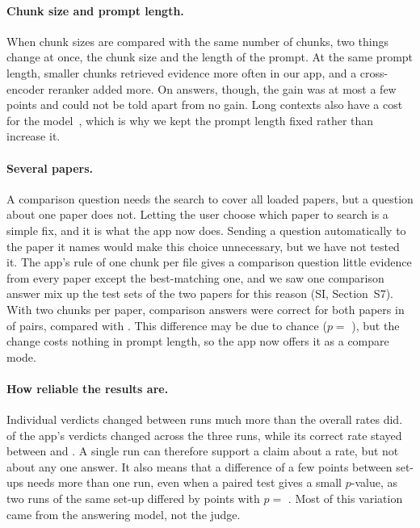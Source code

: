 \paragraph{Chunk size and prompt length.} When chunk sizes are compared with the same number of
chunks, two things change at once, the chunk size and the length of the prompt. At the same
prompt length, smaller chunks retrieved evidence more often in our app, and a cross-encoder
reranker added more. On answers, though, the gain was at most a few points and could not be told
apart from no gain. Long contexts also have a cost for the model~\cite{liu2024lost}, which is
why we kept the prompt length fixed rather than increase it.

\paragraph{Several papers.} A comparison question needs the search to cover all loaded papers,
but a question about one paper does not. Letting the user choose which paper to search is a
simple fix, and it is what the app now does. Sending a question automatically to the paper it
names would make this choice unnecessary, but we have not tested it. The app's rule of one chunk
per file gives a comparison question little evidence from every paper except the best-matching
one, and we saw one comparison answer mix up the test sets of the two papers for this reason
(SI, Section~S7). With two chunks per paper, comparison answers were correct for both papers in
\CompareBalancedBothCorrect{} of pairs, compared with \CompareAppBothCorrect{}. This difference
may be due to chance ($p =$ \CompareP{}), but the change costs nothing in prompt length, so the
app now offers it as a compare mode.

\paragraph{How reliable the results are.} Individual verdicts changed between runs much more
than the overall rates did. \RepeatFixedChanged{} of the app's verdicts changed across the three
runs, while its correct rate stayed between \RepeatFixedLow{} and \RepeatFixedHigh{}. A single
run can therefore support a claim about a rate, but not about any one answer. It also means that
a difference of a few points between set-ups needs more than one run, even when a paired test
gives a small $p$-value, as two runs of the same set-up differed by \RepeatWidestPoints{} points
with $p =$ \RepeatWidestP{}. Most of this variation came from the answering model, not the judge.


